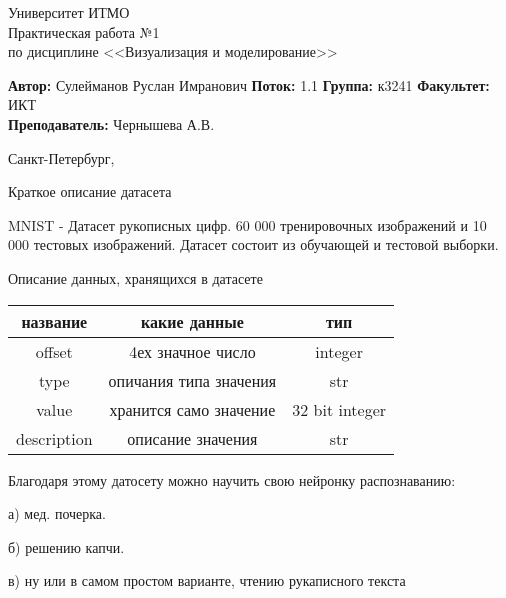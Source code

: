 \documentclass[12pt,a4paper]{article}
\begin{document}
	
\begin{titlepage}
	
\begin{center}
	\large Университет ИТМО\\[5cm]
	\LARGE Практическая работа №1\\
	\normalsize по дисциплине <<Визуализация и моделирование>>\\[5cm]
\end{center}
\begin{flushright}
		\begin{minipage}{0.6\textwidth}
		\begin{flushleft}
			\large
			\singlespacing 
			\textbf{Автор:} Сулейманов Руслан Имранович
			\textbf{Поток:} 1.1
			\textbf{Группа:} к3241
			\textbf{Факультет:} ИКТ\\
			\textbf{Преподаватель:} Чернышева А.В.
		\end{flushleft}
	\end{minipage}
\end{flushright}

\vfill

\begin{center}
	{\large Санкт-Петербург, \the{}}
\end{center}
 
\end{titlepage}
\normalsize

Краткое описание датасета

MNIST - Датасет рукописных цифр. 60 000 тренировочных изображений и 10 000 тестовых изображений.
Датасет состоит из обучающей и тестовой выборки.

Описание данных, хранящихся в датасете 


\begin{tabular}{c|c|c}
 название & какие данные & тип \\
\hline
offset & 4ех значное число & integer \\
type & опичания типа значения & str  \\
value & хранится само значение & 32 bit integer  \\
description & описание значения & str  \\
\end{tabular}


Благодаря этому датосету можно научить свою нейронку распознаванию:

а) мед. почерка.

б) решению капчи.

в) ну или в самом простом варианте, чтению рукаписного текста
\end{document}

